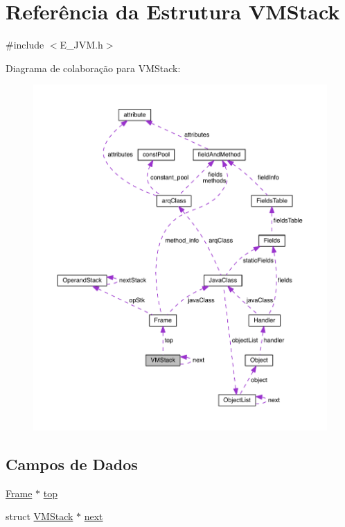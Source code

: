 \hypertarget{struct_v_m_stack}{}\section{Referência da Estrutura V\+M\+Stack}
\label{struct_v_m_stack}


{\ttfamily \#include $<$E\+\_\+\+J\+V\+M.\+h$>$}



Diagrama de colaboração para V\+M\+Stack\+:\nopagebreak
\begin{figure}[H]
\begin{center}
\leavevmode
\includegraphics[width=350pt]{struct_v_m_stack__coll__graph}
\end{center}
\end{figure}
\subsection*{Campos de Dados}
\begin{DoxyCompactItemize}
\item 
\hyperlink{struct_frame}{Frame} $\ast$ \hyperlink{struct_v_m_stack_a4ced44fa90e0389a8b25963637c1708d}{top}
\item 
struct \hyperlink{struct_v_m_stack}{V\+M\+Stack} $\ast$ \hyperlink{struct_v_m_stack_ab4cf67571dfab96182dfd57bf6037d6b}{next}
\end{DoxyCompactItemize}



